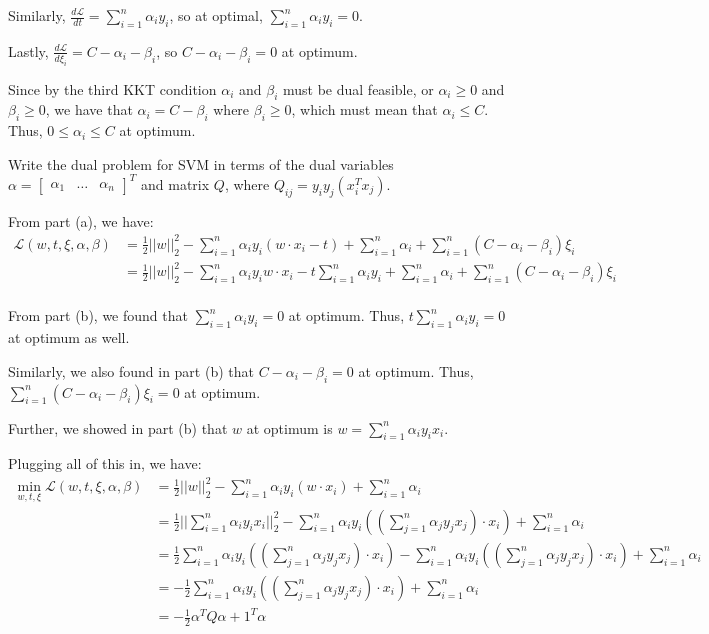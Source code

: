 \begin{Parts}
\begin{solution}
Similarly, $\frac{d\mathcal{L}}{dt} = \sum_{i=1}^n \alpha_i y_i$, so at optimal, $\sum_{i=1}^n \alpha_i y_i = 0$.

Lastly, $\frac{d\mathcal{L}}{d\xi_i} = C - \alpha_i - \beta_i$, so $C - \alpha_i - \beta_i = 0$ at optimum.

Since by the third KKT condition $\alpha_i$ and $\beta_i$ must be dual feasible, or $\alpha_i \geq 0$ and $\beta_i \geq 0$, we have that $\alpha_i = C - \beta_i$ where $\beta_i \geq 0$, which must mean that $\alpha_i \leq C$. Thus, $0 \leq \alpha_i \leq C$ at optimum.
\end{solution}

\Part
Write the dual problem for SVM in terms of the dual variables $\alpha = \begin{bmatrix}\alpha_1 & \ldots & \alpha_n \end{bmatrix}^T$ and matrix $Q$, where $Q_{ij} = y_i y_j (x_i^Tx_j)$.

\begin{solution}
From part (a), we have:
\begin{align*}
\mathcal{L}(w, t, \xi, \alpha, \beta) &= \frac{1}{2} ||w||_2^2 - \sum_{i=1}^n \alpha_iy_i(w \cdot x_i - t)  + \sum_{i=1}^n \alpha_i + \sum_{i=1}^n (C - \alpha_i - \beta_i) \xi_i \\
&= \frac{1}{2} ||w||_2^2 - \sum_{i=1}^n \alpha_iy_i w \cdot x_i - t \sum_{i=1}^n \alpha_iy_i  + \sum_{i=1}^n \alpha_i + \sum_{i=1}^n (C - \alpha_i - \beta_i) \xi_i \\
\end{align*}

From part (b), we found that $\sum_{i=1}^n \alpha_iy_i = 0$ at optimum. Thus, $t \sum_{i=1}^n \alpha_iy_i = 0$ at optimum as well.

Similarly, we also found in part (b) that $C - \alpha_i - \beta_i = 0$ at optimum. Thus, $\sum_{i=1}^n (C - \alpha_i - \beta_i) \xi_i = 0$ at optimum.

Further, we showed in part (b) that $w$ at optimum is $w = \sum_{i=1}^n \alpha_i y_i x_i$.

Plugging all of this in, we have:
\begin{align*}
\min_{w, t, \xi} \mathcal{L}(w, t, \xi, \alpha, \beta) &= \frac{1}{2} ||w||_2^2 - \sum_{i=1}^n \alpha_iy_i (w \cdot x_i) + \sum_{i=1}^n \alpha_i \\
&= \frac{1}{2} ||\sum_{i=1}^n \alpha_i y_i x_i||_2^2 - \sum_{i=1}^n \alpha_iy_i ((\sum_{j=1}^n \alpha_j y_j x_j) \cdot x_i) + \sum_{i=1}^n \alpha_i \\
&= \frac{1}{2} \sum_{i=1}^n \alpha_iy_i ((\sum_{j=1}^n \alpha_j y_j x_j) \cdot x_i)  - \sum_{i=1}^n \alpha_iy_i ((\sum_{j=1}^n \alpha_j y_j x_j) \cdot x_i) + \sum_{i=1}^n \alpha_i \\
&= -\frac{1}{2} \sum_{i=1}^n \alpha_iy_i ((\sum_{j=1}^n \alpha_j y_j x_j) \cdot x_i) + \sum_{i=1}^n \alpha_i \\
&= -\frac{1}{2} \alpha^T Q \alpha + 1^T \alpha \\
\end{align*}


\end{solution}
\end{Parts}
